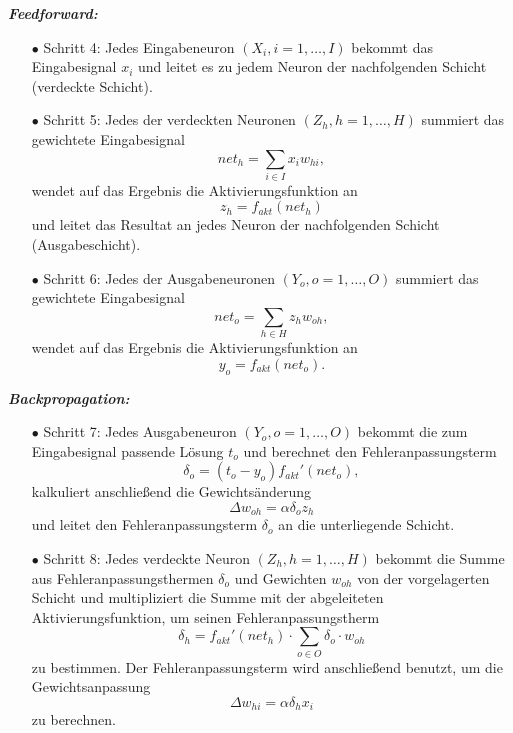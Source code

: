 \textbf{\textit{Feedforward:}}
\begin{itemize}
\item[\textbf{$\bullet$}] Schritt 4: Jedes Eingabeneuron $(X_{i}, i=1,\dots,I)$ bekommt das Eingabesignal $x_{i}$ und leitet es zu jedem Neuron der nachfolgenden Schicht (verdeckte Schicht).

\item[\textbf{$\bullet$}] Schritt 5: Jedes der verdeckten Neuronen $(Z_{h}, h=1,\dots,H)$ summiert das gewichtete Eingabesignal
\begin{equation}
net_{h}=\sum\limits_{i \in I} x_{i}w_{hi},
\end{equation}
wendet auf das Ergebnis die Aktivierungsfunktion an 
\begin{equation}
z_{h}=f_{akt}(net_{h})
\end{equation}
und leitet das Resultat an jedes Neuron der nachfolgenden Schicht (Ausgabeschicht).

\item[\textbf{$\bullet$}] Schritt 6: Jedes der Ausgabeneuronen $(Y_{o}, o=1,\dots,O)$ summiert das gewichtete Eingabesignal 
\begin{equation}
net_{o}=\sum\limits_{h \in H} z_{h}w_{oh},
\end{equation}
wendet auf das Ergebnis die Aktivierungsfunktion an 
\begin{equation}
y_{o}=f_{akt}(net_{o}).
\end{equation}
\end{itemize}

\textbf{\textit{Backpropagation:}}
\begin{itemize}
\item[\textbf{$\bullet$}] Schritt 7: Jedes Ausgabeneuron $(Y_{o}, o=1,\dots,O)$ bekommt die zum Eingabesignal passende Lösung $t_{o}$ und berechnet den Fehleranpassungsterm 
\begin{equation}
\delta_{o}=(t_{o}-y_{o})f_{akt}'(net_{o}),
\end{equation}
kalkuliert anschließend die Gewichtsänderung 
\begin{equation}
\Delta w_{oh}=\alpha \delta_{o} z_{h}
\end{equation}
und leitet den Fehleranpassungsterm $\delta_{o}$ an die unterliegende Schicht.

\item[\textbf{$\bullet$}] Schritt 8: Jedes verdeckte Neuron $(Z_{h}, h=1,\dots,H)$ bekommt die Summe aus Fehleranpassungsthermen $\delta_o$ und Gewichten $w_{oh}$ von der vorgelagerten Schicht und multipliziert die Summe mit der abgeleiteten Aktivierungsfunktion, um seinen Fehleranpassungstherm 
\begin{equation}
\delta_{h}=f_{akt}'(net_{h}) \cdot \sum\limits_{o \in O} \delta_{o} \cdot w_{oh}
\end{equation}
zu bestimmen. Der Fehleranpassungsterm wird anschließend benutzt, um die Gewichtsanpassung 
\begin{equation}
\Delta w_{hi}=\alpha \delta_{h} x_{i}
\end{equation}
zu berechnen.
\end{itemize}

